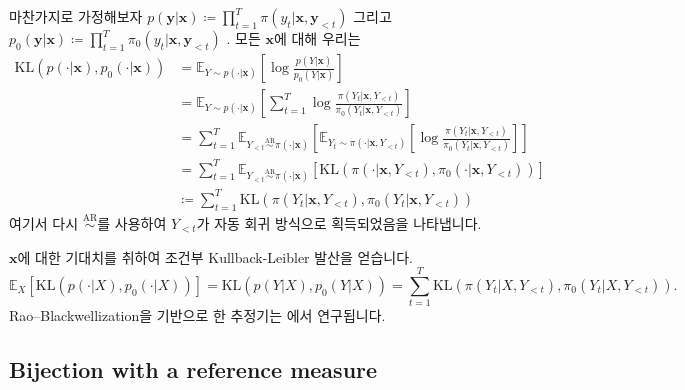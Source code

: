 \documentclass{article}
\def\x{{\bm{x}}}
\def\y{{\bm{y}}}
\def\EE{{\mathbb{E}}}
\def\arsim{\overset{\text{AR}}{\sim}}
\begin{document}
마찬가지로 가정해보자 
 $p(\y|\x) \coloneqq \prod_{t=1}^T \pi(y_t|\x,\y_{<t})$ 
그리고
 $p_0(\y|\x) \coloneqq \prod_{t=1}^T \pi_0(y_t|\x,\y_{<t})$ .
모든 $\x$에 대해 우리는
 \begin{align}  
 \mathrm{KL} (p( \cdot | \x ), p_0( \cdot | \x )) 
&= \EE _{Y \sim p( \cdot | \x )} \left [ \log \frac{p(Y|\x)} {p_0(Y| \x )} \right ] \\
&= \EE _{Y \sim p( \cdot | \x )} \left [ \sum _{t=1}^T \log \frac { \pi (Y_t| \x , Y_{<t})}{ \pi _0(Y_t| \x , Y_{<t})} \right ]\\ 
&= \sum _{t=1}^T \EE _{Y_{<t} \arsim \pi ( \cdot | \x )} \left [ \EE _{Y_t \sim \pi ( \cdot | \x , Y_{<t})} \left [ \log \frac { \pi (Y_t| \x , Y_{<t})}{ \pi _0(Y_t| \x , Y_{<t})} \right ] \right ] \\
&= \sum _{t=1}^T \EE _{Y_{<t} \arsim \pi ( \cdot | \x )} \left [ \mathrm{KL} ( \pi ( \cdot | \x , Y_{<t}), \pi _0( \cdot | \x , Y_{<t})) \right ] \\
& \coloneqq \sum _{t=1}^T \mathrm{KL} ( \pi (Y_t| \x , Y_{<t}), \pi _0(Y_t| \x , Y_{<t}))
 \end{align} 
여기서 다시 $\arsim$를 사용하여 $Y_{<t}$가 자동 회귀 방식으로 획득되었음을 나타냅니다.

$\x$에 대한 기대치를 취하여 조건부 Kullback-Leibler 발산을 얻습니다.
 \begin{equation} 
 \EE _X \left [ \mathrm{KL} (p( \cdot |X), p_0( \cdot |X)) \right ] 
=
 \mathrm{KL} (p(Y|X), p_0(Y|X))
= 
 \sum _{t=1}^T \mathrm{KL} ( \pi (Y_t|X, Y_{<t}), \pi _0(Y_t|X, Y_{<t})).
 \end{equation} 
Rao–Blackwellization을 기반으로 한 추정기는 \citep{amini2025better}에서 연구됩니다.

\subsection{Bijection with a reference measure} 
 \label{sec:bijection_with_ref_measure}
\end{document}
